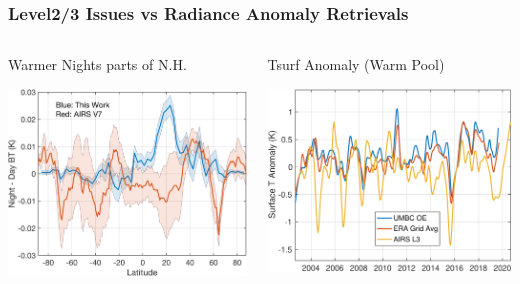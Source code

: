 \documentclass[10pt,t]{beamer}
\begin{document}
\begin{frame}
\frametitle{Level2/3 Issues vs Radiance Anomaly Retrievals}
\vspace{-0.2in}

\begin{columns}
\begin{column}{0.55\columnwidth}
\begin{block}{\footnotesize Warmer Nights parts of N.H.}
\vspace{-0.1in}
\begin{center}
\includegraphics[width=\linewidth]{./Figs21/desc_minus_asc_5pc_hot_bt_trend_with_airs_v7.png}
\end{center}
\end{block}
\end{column}


\begin{column}{0.5\columnwidth}
\begin{block}{\footnotesize Tsurf Anomaly (Warm Pool)}
\vspace{-0.05in}
\begin{center}
\includegraphics[width=\linewidth]{./Figs21/pro_tsurf_anom.pdf}
\end{center}
\end{block}
\end{column}
\end{columns}


\end{frame}
\end{document}
